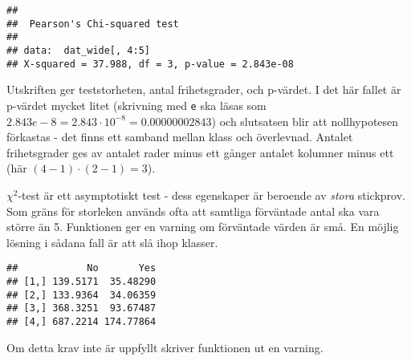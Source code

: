\documentclass[
]{book}
\newenvironment{Shaded}{\begin{snugshade}}{\end{snugshade}}
\newcommand{\CommentTok}[1]{\textcolor[rgb]{0.56,0.35,0.01}{\textit{#1}}}
\newcommand{\DecValTok}[1]{\textcolor[rgb]{0.00,0.00,0.81}{#1}}
\newcommand{\FunctionTok}[1]{\textcolor[rgb]{0.00,0.00,0.00}{#1}}
\newcommand{\NormalTok}[1]{#1}
\newcommand{\OtherTok}[1]{\textcolor[rgb]{0.56,0.35,0.01}{#1}}
\newcommand{\SpecialCharTok}[1]{\textcolor[rgb]{0.00,0.00,0.00}{#1}}
\theoremstyle{definition}
\theoremstyle{definition}
\theoremstyle{definition}
\theoremstyle{definition}
\theoremstyle{remark}
\begin{document}
\begin{verbatim}
## 
##  Pearson's Chi-squared test
## 
## data:  dat_wide[, 4:5]
## X-squared = 37.988, df = 3, p-value = 2.843e-08
\end{verbatim}

Utskriften ger teststorheten, antal frihetsgrader, och p-värdet. I det här fallet är p-värdet mycket litet (skrivning med \texttt{e} ska läsas som \(2.843e-8 = 2.843 \cdot 10^{-8} = 0.00000002843\)) och slutsatsen blir att nollhypotesen förkastas - det finns ett samband mellan klass och överlevnad. Antalet frihetsgrader ges av antalet rader minus ett gånger antalet kolumner minus ett (här \((4-1) \cdot (2-1) = 3\)).

\(\chi^2\)-test är ett asymptotiskt test - dess egenskaper är beroende av \emph{stora} stickprov. Som gräns för storleken används ofta att samtliga förväntade antal ska vara större än 5. Funktionen ger en varning om förväntade värden är små. En möjlig lösning i sådana fall är att slå ihop klasser.

\begin{Shaded}
\end{Shaded}

\begin{verbatim}
##            No       Yes
## [1,] 139.5171  35.48290
## [2,] 133.9364  34.06359
## [3,] 368.3251  93.67487
## [4,] 687.2214 174.77864
\end{verbatim}

Om detta krav inte är uppfyllt skriver funktionen ut en varning.

\begin{Shaded}
\end{Shaded}
\end{document}
